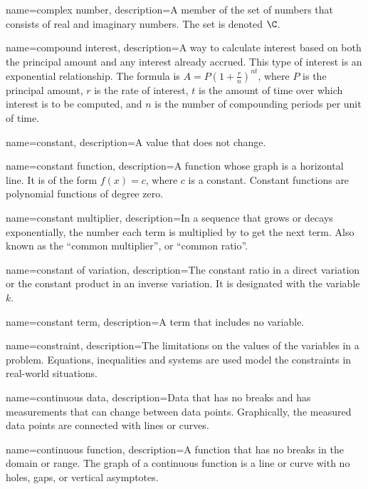  {
	name=complex number,
	description={A member of the set of numbers that consists of real and imaginary numbers. The set is denoted $\C$.}
}

 {
	name=compound interest,
	description={A way to calculate interest based on both the principal amount and any interest already accrued. This type of interest is an exponential relationship. The formula is $A = P \left(1 + \frac{r}{n} \right)^{nt}$, where $P$ is the principal amount, $r$ is the rate of interest, $t$ is the amount of time over which interest is to be computed, and $n$ is the number of compounding periods per unit of time.}
}

 {
	name=constant,
	description={A value that does not change.}
}

 {
	name=constant function,
	description={A function whose graph is a horizontal line. It is of the form $f(x) = c$, where $c$ is a constant. Constant functions are polynomial functions of degree zero.}
}

 {
	name=constant multiplier,
	description={In a sequence that grows or decays exponentially, the number each term is multiplied by to get the next term. Also known as the ``common multiplier'', or ``common ratio''.}
}

 {
	name=constant of variation,
	description={The constant ratio in a direct variation or the constant product in an inverse variation. It is designated with the variable $k$.}
}

 {
	name=constant term,
	description={A term that includes no variable.}
}

 {
	name=constraint,
	description={The limitations on the values of the variables in a problem. Equations, inequalities and systems are used model the constraints in real-world situations.}
}

 {
	name=continuous data,
	description={Data that has no breaks and has measurements that can change between data points. Graphically, the measured data points are connected with lines or curves.}
}

 {
	name=continuous function,
	description={A function that has no breaks in the domain or range. The graph of a continuous function is a line or curve with no holes, gaps, or vertical asymptotes.}
}

